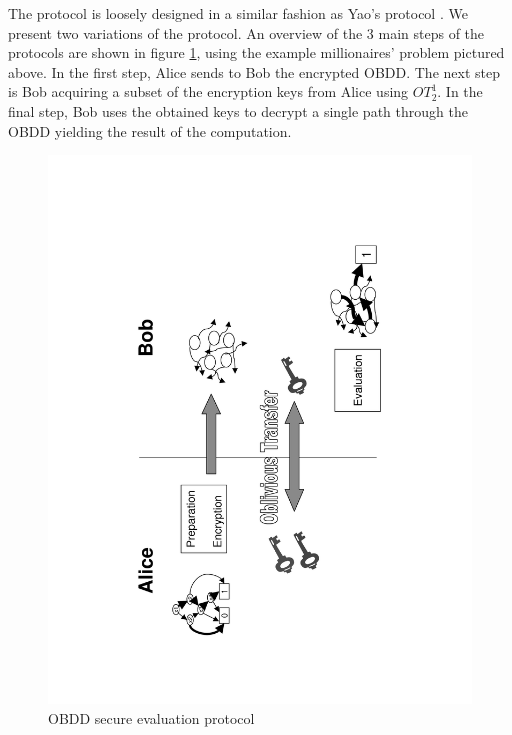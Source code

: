 The protocol is loosely designed in a similar fashion as Yao's protocol
\cite{Yao86}. We present two variations of the protocol. An overview
of the 3 main steps of the protocols are shown in figure \ref{fig:OBDD-overview},
using the example millionaires' problem pictured above. In the first
step, Alice sends to Bob the encrypted OBDD. The next step is Bob
acquiring a subset of the encryption keys from Alice using $OT_{2}^{1}$.
In the final step, Bob uses the obtained keys to decrypt a single
path through the OBDD yielding the result of the computation. %


%
\begin{figure}
\begin{centering}
\includegraphics[scale=0.4,angle=270]{chapters/obdd_proto_overview} 
\par\end{centering}

\caption{\label{fig:OBDD-overview}OBDD secure evaluation protocol}

\end{figure}


